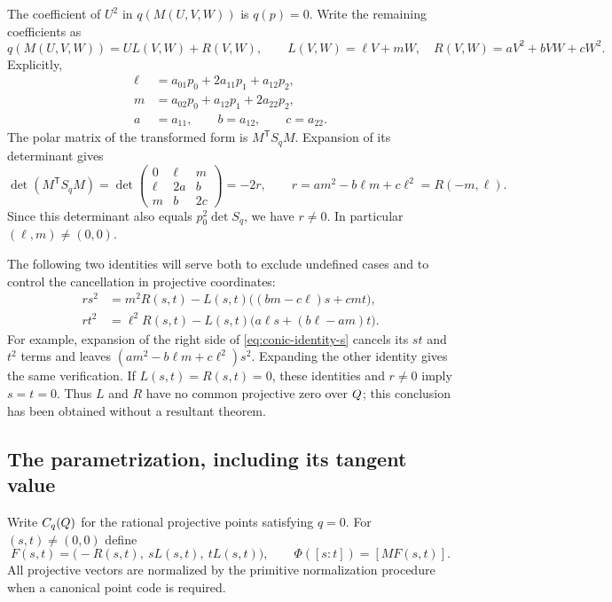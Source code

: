The coefficient of $U^2$ in $q(M(U,V,W))$ is $q(p)=0$.
Write the remaining coefficients as
\begin{equation}\label{eq:conic-normal}
 q(M(U,V,W))=U L(V,W)+R(V,W),
 \qquad
 L(V,W)=\ell V+mW,\quad R(V,W)=aV^2+bVW+cW^2.
\end{equation}
Explicitly,
\[
\begin{split}
 \ell&=a_{01}p_0+2a_{11}p_1+a_{12}p_2,\\
 m&=a_{02}p_0+a_{12}p_1+2a_{22}p_2,\\
 a&=a_{11},\qquad b=a_{12},\qquad c=a_{22}.
\end{split}
\]
The polar matrix of the transformed form is $M^{\mathsf T}S_qM$.
Expansion of its determinant gives
\begin{equation}\label{eq:conic-r}
 \det(M^{\mathsf T}S_qM)
 =\det\begin{pmatrix}0&\ell&m\\\ell&2a&b\\m&b&2c\end{pmatrix}
 =-2r,
 \qquad r=am^2-b\ell m+c\ell^2=R(-m,\ell).
\end{equation}
Since this determinant also equals $p_0^2\det S_q$, we have $r\ne0$.
In particular $(\ell,m)\ne(0,0)$.

The following two identities will serve both to exclude undefined cases
and to control the cancellation in projective coordinates:
\begin{align}
 rs^2&=m^2R(s,t)
   -L(s,t)\bigl((bm-c\ell)s+cmt\bigr),\label{eq:conic-identity-s}\\
 rt^2&=\ell^2R(s,t)
   -L(s,t)\bigl(a\ell s+(b\ell-am)t\bigr).
   \label{eq:conic-identity-t}
\end{align}
For example, expansion of the right side of
\eqref{eq:conic-identity-s} cancels its $st$ and $t^2$ terms and leaves
$(am^2-b\ell m+c\ell^2)s^2$.  Expanding the other identity gives the
same verification.  If $L(s,t)=R(s,t)=0$, these identities and $r\ne0$
imply $s=t=0$.  Thus $L$ and $R$ have no common projective zero over
$Q$; this conclusion has been obtained without a resultant theorem.

\subsection{The parametrization, including its tangent value}

Write $C_q(Q)$ for the rational projective points satisfying $q=0$.
For $(s,t)\ne(0,0)$ define
\begin{equation}\label{eq:conic-param}
 F(s,t)=\bigl(-R(s,t),\ sL(s,t),\ tL(s,t)\bigr),
 \qquad
 \Phi([s:t])=[M F(s,t)].
\end{equation}
All projective vectors are normalized by the primitive normalization
procedure when a canonical point code is required.

